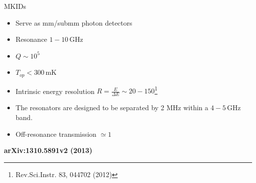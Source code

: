 \documentclass[ignorenonframetext,12pt]{beamer}
\begin{document}
\begin{frame}{MKIDs}
				\begin{itemize}
								\item Serve as mm/submm photon detectors
								\item Resonance  $1-10\,\text{GHz}$ 
								\item $Q \sim 10^5$
								\item $T_{op} < 300\,\text{mK}$
								\item Intrinsic energy resolution $R = \frac{E}{\Delta E} \sim
												20-150$\footnote{Rev.Sci.Instr. 83, 044702 (2012)}
								\item The resonators are designed to be separated by 2 MHz
												within a $4-5\,\text{GHz}$ band.
								\item Off-resonance transmission $\simeq 1$
				\end{itemize}

				\tiny{\textbf{arXiv:1310.5891v2 (2013)}}
\end{frame}
\end{document}
